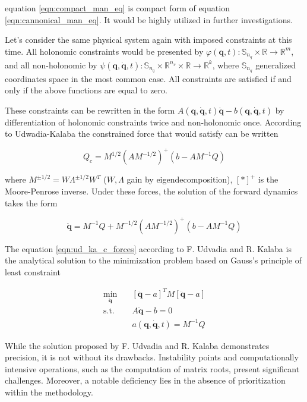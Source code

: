 equation \ref{eqn:compact_man_eq} is compact form of equation 
\ref{eqn:cannonical_man_eq}. It would be highly utilized in further 
investigations.

Let's consider the same physical system again with imposed constraints at this time.
All holonomic constraints would be presented by 
$\varphi(\mathbf{q}, t): \mathbb{S}_{n_q} \times \mathbb{R} \rightarrow \mathbb{R}^m$, and 
all non-holonomic by 
$
\psi(\mathbf{q}, \dot{\mathbf{q}}, t): \mathbb{S}_{n_q} \times \mathbb{R}^{n_v} 
\times \mathbb{R} \rightarrow \mathbb{R}^k
$, where $\mathbb{S}_{n_q}$ generalized coordinates space in the most common case.
All constraints are satisfied if and only if the above functions are equal to zero.

These constraints can be rewritten in the form 
$
A(\mathbf{q}, \dot{\mathbf{q}}, t) \ddot{\mathbf{q}} 
- b(\mathbf{q}, \dot{\mathbf{q}}, t)
$
by differentiation of holonomic constraints twice and non-holonomic once.
According to Udwadia-Kalaba the constrained force that would satisfy can be 
written

\begin{equation}
    \label{eqn:ud_ka_c_forces}
    Q_c = M^{1 / 2} (A M^{-1/2})^+(b - A M ^ {-1} Q)
\end{equation}

where $M^{\pm 1 / 2} = W \Lambda^{\pm 1/ 2} W^T$ ($W, \Lambda$ gain by 
eigendecomposition), $[*]^+$ is the Moore-Penrose inverse. Under these forces, 
the solution of the forward dynamics takes the form

\begin{equation}
    \label{eqn:forward_dyn_with_cf}
    \ddot{\mathbf{q}} = M^{-1}Q + M^{-1 / 2} (A M^{-1/2})^+(b - A M ^ {-1} Q)
\end{equation}

The equation \ref{eqn:ud_ka_c_forces} according to F. Udvadia and R. Kalaba
\cite{UdwadiaKalabaApproach} is the analytical solution to the minimization problem
based on Gauss's principle of least constraint

\begin{equation}
    \label{eqn:gauss_min_problem}
    \begin{aligned}
        \min_{\ddot{\mathbf{q}}} \quad &
        [\ddot{\mathbf{q}} - a]^T M [\ddot{\mathbf{q}} - a] \\
        \textrm{s.t.} \quad &
        A \ddot{\mathbf{q}} - b = 0 \\
        \quad &
        a(\mathbf{q}, \dot{\mathbf{q}}, t) = M^{-1} Q
    \end{aligned}
\end{equation}

While the solution proposed by F. Udvadia and R. Kalaba demonstrates precision, 
it is not without its drawbacks. Instability points and computationally intensive 
operations, such as the computation of matrix roots, present significant challenges. 
Moreover, a notable deficiency lies in the absence of prioritization within the 
methodology.
